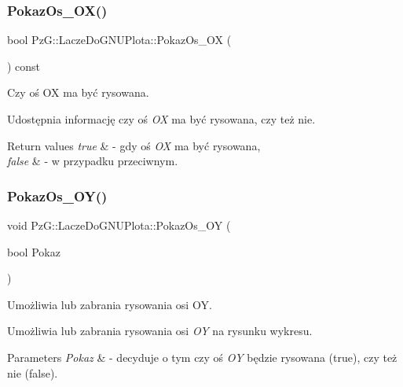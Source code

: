 \subsubsection{\texorpdfstring{Pokaz\+Os\+\_\+\+O\+X()}{PokazOs\_OX()}\hspace{0.1cm}{\footnotesize\ttfamily [2/2]}}
{\footnotesize\ttfamily bool Pz\+G\+::\+Lacze\+Do\+G\+N\+U\+Plota\+::\+Pokaz\+Os\+\_\+\+OX (\begin{DoxyParamCaption}{ }\end{DoxyParamCaption}) const\hspace{0.3cm}{\ttfamily [inline]}}



Czy oś OX ma być rysowana. 

Udostępnia informację czy oś {\itshape OX} ma być rysowana, czy też nie. 
\begin{DoxyRetVals}{Return values}
{\em true} & -\/ gdy oś {\itshape OX} ma być rysowana, \\
\hline
{\em false} & -\/ w przypadku przeciwnym. \\
\hline
\end{DoxyRetVals}
\mbox{\label{classPzG_1_1LaczeDoGNUPlota_a7c3db909b266fc30808e86406c04b516}} 
\subsubsection{\texorpdfstring{Pokaz\+Os\+\_\+\+O\+Y()}{PokazOs\_OY()}\hspace{0.1cm}{\footnotesize\ttfamily [1/2]}}
{\footnotesize\ttfamily void Pz\+G\+::\+Lacze\+Do\+G\+N\+U\+Plota\+::\+Pokaz\+Os\+\_\+\+OY (\begin{DoxyParamCaption}\item[{bool}]{Pokaz }\end{DoxyParamCaption})\hspace{0.3cm}{\ttfamily [inline]}}



Umożliwia lub zabrania rysowania osi OY. 

Umożliwia lub zabrania rysowania osi {\itshape OY} na rysunku wykresu. 
\begin{DoxyParams}{Parameters}
{\em Pokaz} & -\/ decyduje o tym czy oś {\itshape OY} będzie rysowana ({\ttfamily true}), czy też nie ({\ttfamily false}). \\
\hline
\end{DoxyParams}
\mbox{\label{classPzG_1_1LaczeDoGNUPlota_a7298f469f6932f5c808dcf620650b4b8}} 
